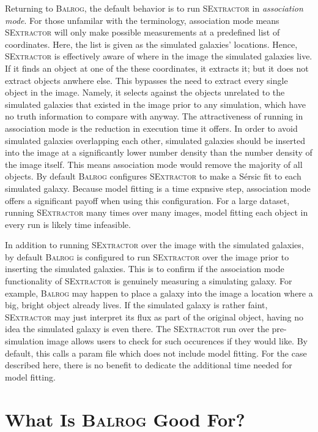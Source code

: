 \documentclass[12pt]{book}
\newcommand{\balrog}{\textsc{Balrog}}
\newcommand{\sex}{\textsc{SExtractor}}
\newcommand{\sersic}{S\'{e}rsic}
\begin{document}
Returning to \balrog{}, the default behavior is to run \sex{} in \emph{association mode}.
For those unfamilar with the terminology, association mode means
\sex{} will only make possible measurements at a predefined list of coordinates.
Here, the list is given as the simulated galaxies' locations. 
Hence, \sex{} is effectively aware of where in the image the simulated galaxies live.
If it finds an object at one of the these coordinates, it extracts it;
but it does not extract objects anwhere else.
This bypasses the need to extract every single object in the image. 
Namely, it  selects against the objects unrelated to the simulated galaxies that 
existed in the image prior to any simulation,
which have no truth information to compare with anyway.
The attractiveness of running in association mode is the reduction in execution time it offers.
In order to avoid simulated galaxies overlapping each other, simulated galaxies should be inserted
into the image at a significantly lower number density than the number density of the image itself.
This means association mode would remove the majority of all objects.
By default \balrog{} configures \sex{} to make a \sersic{} fit to each simulated galaxy.
Because model fitting is a time expnsive step,
association mode offers a significant payoff when using this configuration.
For a large dataset, running \sex{} many times over many images, model fitting 
each object in every run is likely time infeasible.

In addition to running \sex{} over the image with the simulated galaxies,
by default \balrog{} is configured to run \sex{} over the image prior to inserting the simulated galaxies.
This is to confirm if the association mode functionality of \sex{} is genuinely measuring a simulating galaxy.
For example, \balrog{} may happen to place a galaxy into the image a location where a big, bright object already lives.
If the simulated galaxy is rather faint, \sex{} may just interpret its flux as part of the original object, having no
idea the simulated galaxy is even there. The \sex{} run over the pre-simulation image allows users to check
for such occurences if they would like. By default, this calls a param file which does not include model fitting.
For the case described here, there is no benefit to dedicate the additional time needed for model fitting.


\chapter{What Is \balrog{} Good For?}
\label{sec:motivation}
\end{document}
